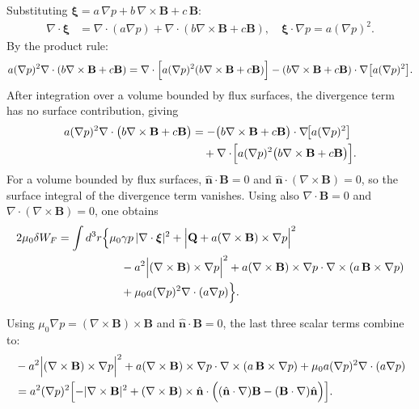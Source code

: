 \documentclass[10pt,a4paper]{article}
\numberwithin{equation}{section}
\begin{document}
Substituting $\boldsymbol{\xi} = a\,\nabla p + b\,\nabla\times\mathbf B + c\,\mathbf B$:
\begin{align}
\nabla\cdot\boldsymbol{\xi} &= \nabla\cdot(a\nabla p)+\nabla\cdot(b\nabla\times\mathbf B+c\mathbf B), \quad \boldsymbol{\xi}\cdot\nabla p = a(\nabla p)^2.
\end{align}
By the product rule:
\begin{equation}
a(\nabla p)^2\nabla\cdot(b\nabla\times\mathbf B+c\mathbf B) =
\nabla\cdot\Bigl[a(\nabla p)^2(b\nabla\times\mathbf B+c\mathbf B)\Bigr]
- (b\nabla\times\mathbf B+c\mathbf B)\cdot\nabla\bigl[a(\nabla p)^2\bigr].
\end{equation}
After integration over a volume bounded by flux surfaces, the divergence term
has no surface contribution, giving
\begin{align}
a(\nabla p)^2\nabla\cdot\bigl(b\nabla\times\mathbf B+c\mathbf B\bigr)
&=
-\bigl(b\nabla\times\mathbf B+c\mathbf B\bigr)\cdot\nabla\!\bigl[a(\nabla p)^2\bigr]
\nonumber\\
&\quad
+\nabla\cdot\!\Bigl[a(\nabla p)^2\bigl(b\nabla\times\mathbf B+c\mathbf B\bigr)\Bigr].
\end{align}
For a volume bounded by flux surfaces, \(\hat{\mathbf n}\cdot\mathbf B=0\) and \(\hat{\mathbf n}\cdot(\nabla\times\mathbf B)=0\), so the surface integral of the divergence term vanishes. Using also \(\nabla\cdot\mathbf B=0\) and \(\nabla\cdot(\nabla\times\mathbf B)=0\), one obtains
\begin{align}
2\mu_0 \delta W_F
=
\int d^3r\Bigl\{
&\mu_0\gamma p\,|\nabla\cdot\boldsymbol{\xi}|^2
+\Bigl|\mathbf Q+a(\nabla\times\mathbf B)\times\nabla p\Bigr|^2
\nonumber\\
&\quad
-a^2\Bigl|(\nabla\times\mathbf B)\times\nabla p\Bigr|^2
+a(\nabla\times\mathbf B)\times\nabla p\cdot\nabla\times(a\,\mathbf B\times\nabla p)
\nonumber\\
&\quad
+\mu_0 a(\nabla p)^2\nabla\cdot(a\nabla p)
\Bigr\}.
\end{align}

Using $\mu_0\nabla p = (\nabla\times\mathbf B)\times\mathbf B$ and $\hat{\mathbf n}\cdot\mathbf B=0$, the last three scalar terms combine to:
\begin{align}
&-a^2\Bigl|(\nabla\times\mathbf B)\times\nabla p\Bigr|^2 +a(\nabla\times\mathbf B)\times\nabla p\cdot\nabla\times(a\,\mathbf B\times\nabla p) +\mu_0 a(\nabla p)^2\nabla\cdot(a\nabla p) \nonumber\\
&= a^2(\nabla p)^2 \Bigl[-|\nabla\times\mathbf B|^2 +(\nabla\times\mathbf B)\times\hat{\mathbf n}\cdot\Bigl((\hat{\mathbf n}\cdot\nabla)\mathbf B-(\mathbf B\cdot\nabla)\hat{\mathbf n}\Bigr)\Bigr].
\end{align}
\end{document}
